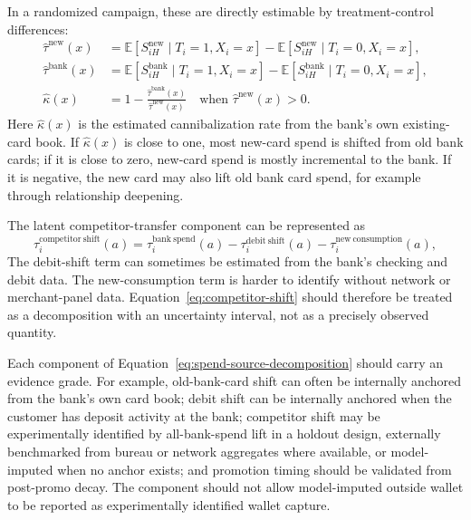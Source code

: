 \documentclass[11pt]{article}
\newcommand{\E}{\mathbb{E}}
\newcommand{\1}{\mathbf{1}}
\begin{document}
In a randomized campaign, these are directly estimable by treatment-control
differences:
\begin{align}
  \widehat{\tau}^{\mathrm{new}}(x)
    &=
    \E[S^{\mathrm{new}}_{iH}\mid T_i=1,X_i=x]
    -\E[S^{\mathrm{new}}_{iH}\mid T_i=0,X_i=x],
    \label{eq:randomized-new}\\
  \widehat{\tau}^{\mathrm{bank}}(x)
    &=
    \E[S^{\mathrm{bank}}_{iH}\mid T_i=1,X_i=x]
    -\E[S^{\mathrm{bank}}_{iH}\mid T_i=0,X_i=x],
    \label{eq:randomized-bank}\\
  \widehat{\kappa}(x)
    &=
    1-\frac{\widehat{\tau}^{\mathrm{bank}}(x)}
            {\widehat{\tau}^{\mathrm{new}}(x)}
    \quad\text{when }\widehat{\tau}^{\mathrm{new}}(x)>0.
    \label{eq:cannibalization-rate}
\end{align}
Here $\widehat{\kappa}(x)$ is the estimated cannibalization rate from the bank's
own existing-card book. If $\widehat{\kappa}(x)$ is close to one, most new-card
spend is shifted from old bank cards; if it is close to zero, new-card spend is
mostly incremental to the bank. If it is negative, the new card may also lift old
bank card spend, for example through relationship deepening.

The latent competitor-transfer component can be represented as
\begin{equation}
  \tau_i^{\mathrm{competitor\ shift}}(a)
  =
  \tau_i^{\mathrm{bank\ spend}}(a)
  - \tau_i^{\mathrm{debit\ shift}}(a)
  - \tau_i^{\mathrm{new\ consumption}}(a),
  \label{eq:competitor-shift}
\end{equation}
The debit-shift term can sometimes be estimated from the bank's checking and
debit data. The new-consumption term is harder to identify without network or
merchant-panel data. Equation~\eqref{eq:competitor-shift} should therefore be
treated as a decomposition with an uncertainty interval, not as a precisely
observed quantity.

Each component of
Equation~\eqref{eq:spend-source-decomposition} should carry an evidence grade.
For example, old-bank-card shift can often be internally anchored from the
bank's own card book; debit shift can be internally anchored when the customer
has deposit activity at the bank; competitor shift may be experimentally
identified by all-bank-spend lift in a holdout design, externally benchmarked
from bureau or network aggregates where available, or model-imputed when no
anchor exists; and promotion timing should be validated from post-promo decay.
The component should not allow model-imputed outside wallet to be reported as
experimentally identified wallet capture.
\end{document}
